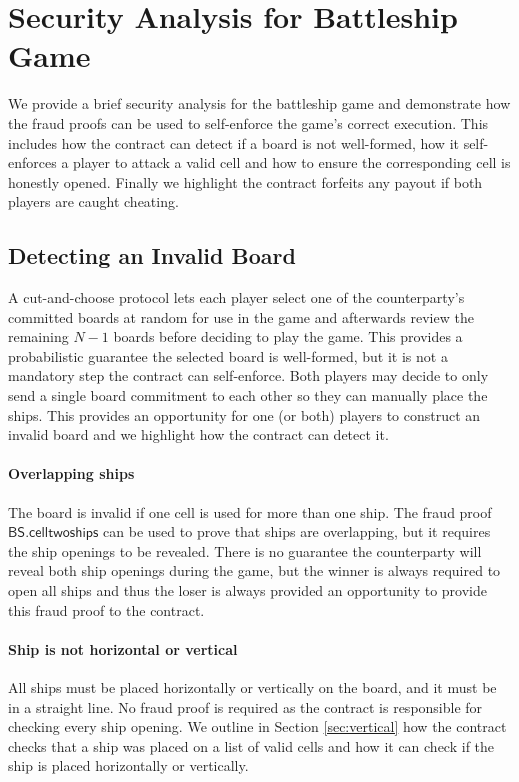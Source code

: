 \documentclass{llncs}
\newcommand{\battleshiptwoships}{\mathsf{BS.celltwoships}}
\begin{document}
	
	
	\appendix
	
	
	
	\section{Security Analysis for Battleship Game} \label{sec:secanalysis}
	
	We provide a brief security analysis for the battleship game and demonstrate how the fraud proofs can be used to self-enforce the game's correct execution.
	This includes how the contract can detect if a board is not well-formed, how it self-enforces a player to attack a valid cell and how to ensure the corresponding cell is honestly opened. 
	Finally we highlight the contract forfeits any payout if both players are caught cheating. 
	
	\subsection{Detecting an Invalid Board} \label{sec:cutandchoose}
	
	A cut-and-choose protocol lets each player select one of the counterparty's committed boards at random for use in the game and afterwards review the remaining $N-1$ boards before deciding to play the game. 
	This provides a probabilistic guarantee the selected board is well-formed, but it is not a mandatory step the contract can self-enforce. 
	Both players may decide to only send a single board commitment to each other so they can manually place the ships. 
	This provides an opportunity for one (or both) players to construct an invalid board and we highlight how the contract can detect it.  
	
	\paragraph{Overlapping ships}
	The board is invalid if one cell is used for more than one ship. 
	The fraud proof $\battleshiptwoships$ can be used to prove that ships are overlapping, but it requires the ship openings to be revealed. 
	There is no guarantee the counterparty will reveal both ship openings during the game, but the winner is always required to open all ships and thus the loser is always provided an opportunity to provide this fraud proof to the contract. 
	
	\paragraph{Ship is not horizontal or vertical}
	All ships must be placed horizontally or vertically on the board, and it must be in a straight line. 
	No fraud proof is required as the contract is responsible for checking every ship opening. 
	We outline in Section \ref{sec:vertical} how the contract checks that a ship was placed on a list of valid cells and how it can check if the ship is placed horizontally or vertically. 
	
\end{document}
